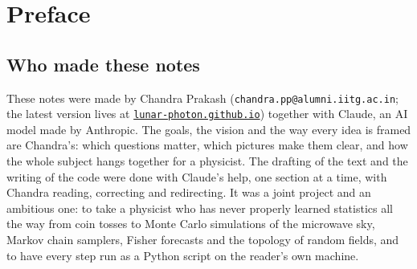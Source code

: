 {}
 \chapter*{Preface}
\setcounter{figure}{0}\setcounter{wdef}{0}\setcounter{wex}{0}\setcounter{lstlisting}{0}
\renewcommand{\thefigure}{P.\arabic{figure}}
\renewcommand{\thewdef}{P.\arabic{wdef}}
\renewcommand{\thewex}{P.\arabic{wex}}
\renewcommand{\thelstlisting}{P.\arabic{lstlisting}}

\section*{Who made these notes}
These notes were made by Chandra Prakash
(\texttt{chandra.pp@alumni.iitg.ac.in}; the latest version lives at
\href{https://lunar-photon.github.io}{\texttt{lunar-photon.github.io}})
together with Claude, an AI model made by Anthropic. The goals, the vision
and the way every idea is framed are Chandra's: which questions matter, which
pictures make them clear, and how the whole subject hangs together for a
physicist. The drafting of the text and the writing of the code were done
with Claude's help, one section at a time, with Chandra reading, correcting
and redirecting. It was a joint project and an ambitious one: to take a
physicist who has never properly learned statistics all the way from coin
tosses to Monte Carlo simulations of the microwave sky, Markov chain samplers,
Fisher forecasts and the topology of random fields, and to have every step
run as a Python script on the reader's own machine.

